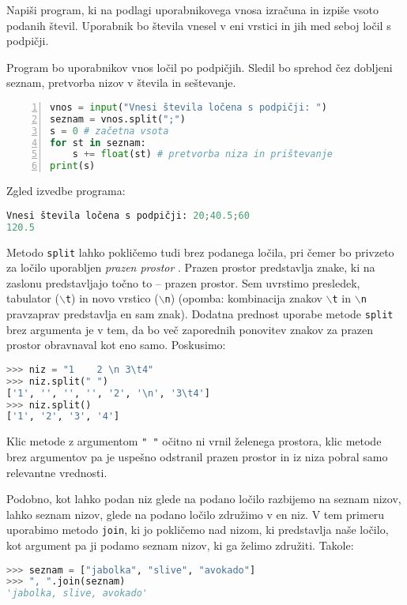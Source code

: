 \begin{zgled}
Napiši program, ki na podlagi uporabnikovega vnosa izračuna in izpiše vsoto podanih števil. Uporabnik bo števila vnesel v eni vrstici in jih med seboj ločil s podpičji. 
\end{zgled}
\begin{resitev}
Program bo uporabnikov vnos ločil po podpičjih. Sledil bo sprehod čez dobljeni seznam, pretvorba nizov v števila in seštevanje.
\begin{lstlisting}[language=Python, showstringspaces=false,numbers=left]
vnos = input("Vnesi števila ločena s podpičji: ")
seznam = vnos.split(";")
s = 0 # začetna vsota
for st in seznam:
    s += float(st) # pretvorba niza in prištevanje
print(s)
\end{lstlisting}
Zgled izvedbe programa:
\begin{lstlisting}[language=Python, showstringspaces=false]
Vnesi števila ločena s podpičji: 20;40.5;60
120.5
\end{lstlisting}
\end{resitev}

Metodo \texttt{split} lahko pokličemo tudi brez podanega ločila, pri čemer bo privzeto za ločilo uporabljen \emph{prazen prostor} . Prazen prostor predstavlja znake, ki na zaslonu predstavljajo točno to -- prazen prostor. Sem uvrstimo presledek, tabulator (\texttt{$\backslash$t}) in novo vrstico (\texttt{$\backslash$n}) (opomba: kombinacija znakov \texttt{$\backslash$t} in \texttt{$\backslash$n} pravzaprav predstavlja en sam znak). Dodatna prednost uporabe metode \texttt{split} brez argumenta je v tem, da bo več zaporednih ponovitev znakov za prazen prostor obravnaval kot eno samo. Poskusimo:
\begin{lstlisting}[language=Python, showstringspaces=false]
>>> niz = "1    2 \n 3\t4"
>>> niz.split(" ")
['1', '', '', '', '2', '\n', '3\t4']
>>> niz.split()
['1', '2', '3', '4']
\end{lstlisting}
Klic metode z argumentom \texttt{" "} očitno ni vrnil želenega prostora, klic metode brez argumentov pa je uspešno odstranil prazen prostor in iz niza pobral samo relevantne vrednosti. 

Podobno, kot lahko podan niz glede na podano ločilo razbijemo na seznam nizov, lahko seznam nizov, glede na podano ločilo združimo v en niz. V tem primeru uporabimo metodo \texttt{join}, ki jo pokličemo nad nizom, ki predstavlja naše ločilo, kot argument pa ji podamo seznam nizov, ki ga želimo združiti. Takole: 
\begin{lstlisting}[language=Python, showstringspaces=false]
>>> seznam = ["jabolka", "slive", "avokado"]
>>> ", ".join(seznam)
'jabolka, slive, avokado'
\end{lstlisting}


